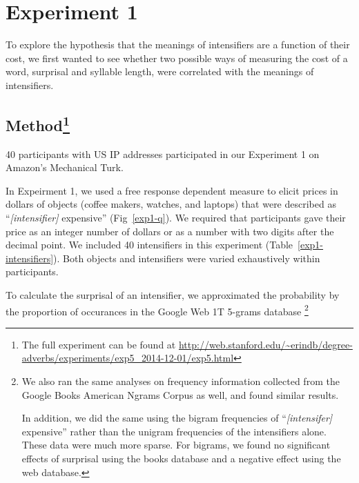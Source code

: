 \documentclass[10pt,letterpaper]{article}
\begin{document}
\section{Experiment 1}

To explore the hypothesis that the meanings of intensifiers are a function of their cost, we first wanted to see whether two possible ways of measuring the cost of a word, surprisal and syllable length, were correlated with the meanings of intensifiers.

\subsection{Method\footnote{The full experiment can be found at \url{http://web.stanford.edu/~erindb/degree-adverbs/experiments/exp5_2014-12-01/exp5.html}}}

40 participants with US IP addresses participated in our Experiment 1 on Amazon's Mechanical Turk.

In Expeirment 1, we used a free response dependent measure to elicit prices in dollars of objects (coffee makers, watches, and laptops) that were described as ``\emph{[intensifier]} expensive'' (Fig~\ref{exp1-q}). We required that participants gave their price as an integer number of dollars or as a number with two digits after the decimal point. We included 40 intensifiers in this experiment (Table~\ref{exp1-intensifiers}). Both objects and intensifiers were varied exhaustively within participants.

To calculate the surprisal of an intensifier, we approximated the probability by the proportion of occurances in the Google Web 1T 5-grams database \cite{web1t5gram}
\footnote{
We also ran the same analyses on frequency information collected from the Google Books American Ngrams Corpus \cite{books2011} as well, and found similar results.

In addition, we did the same using the bigram frequencies of ``\emph{[intensifer]} expensive'' rather than the unigram frequencies of the intensifiers alone. These data were much more sparse. For bigrams, we found no significant effects of surprisal using the books database and a negative effect using the web database.
}


\end{document}
